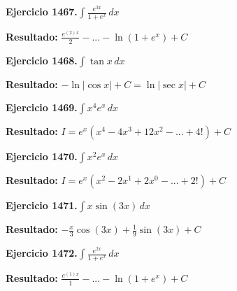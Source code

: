 \documentclass[10pt,a4paper]{article}
\begin{document}
\begin{ejbox}
\textbf{Ejercicio 1467.}\quad $\int \frac{e^{3x}}{1+e^{x}}\,dx$
\end{ejbox}

\begin{solbox}
\textbf{Resultado:} \(\displaystyle \frac{e^{(2)x}}{2} - ... - \ln(1+e^x) + C\)
\end{solbox}

\newpage
\begin{ejbox}
\textbf{Ejercicio 1468.}\quad $\int \tan x\,dx$
\end{ejbox}

\begin{solbox}
\textbf{Resultado:} \(\displaystyle -\ln|\cos x| + C = \ln|\sec x| + C\)
\end{solbox}

\begin{ejbox}
\textbf{Ejercicio 1469.}\quad $\int x^{4} e^x\,dx$
\end{ejbox}

\begin{solbox}
\textbf{Resultado:} \(\displaystyle I = e^x(x^{4} - 4x^{3} + 12x^{2} - ... + 4!) + C\)
\end{solbox}

\begin{ejbox}
\textbf{Ejercicio 1470.}\quad $\int x^{2} e^x\,dx$
\end{ejbox}

\begin{solbox}
\textbf{Resultado:} \(\displaystyle I = e^x(x^{2} - 2x^{1} + 2x^{0} - ... + 2!) + C\)
\end{solbox}

\newpage
\begin{ejbox}
\textbf{Ejercicio 1471.}\quad $\int x \sin(3x)\,dx$
\end{ejbox}

\begin{solbox}
\textbf{Resultado:} \(\displaystyle -\frac{x}{3}\cos(3x) + \frac{1}{9}\sin(3x) + C\)
\end{solbox}

\begin{ejbox}
\textbf{Ejercicio 1472.}\quad $\int \frac{e^{2x}}{1+e^{x}}\,dx$
\end{ejbox}

\begin{solbox}
\textbf{Resultado:} \(\displaystyle \frac{e^{(1)x}}{1} - ... - \ln(1+e^x) + C\)
\end{solbox}
\end{document}
